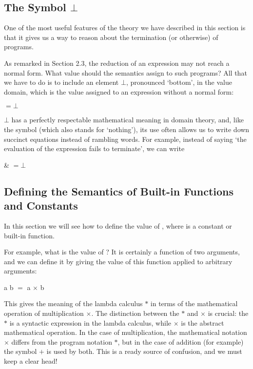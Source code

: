 \subsection{The Symbol $\bot$}

One of the most useful features of the theory we have described in this section
is that it gives us a way to reason about the termination (or otherwise) of
programs.

As remarked in Section 2.3, the reduction of an expression may not reach a
normal form. What value should the semantics assign to such programs? All
that we have to do is to include an element $\bot$, pronounced `bottom', in the
value domain, which is the value assigned to an expression without a normal
form:

\begin{mlcoded}
     $= \bot$
\end{mlcoded}

\noindent$\bot$ has a perfectly respectable mathematical meaning in domain theory, and,
like the symbol  (which also stands for `nothing'), its use often allows us to
write down succinct equations instead of rambling words. For example,
instead of saying `the evaluation of the expression  fails to terminate', we can
write

\begin{mlalign}
     & $= \bot$
\end{mlalign}

\subsection{Defining the Semantics of Built-in Functions and Constants}

In this section we will see how to define the value of , where  is a
constant or built-in function.

For example, what is the value of ? It is certainly a function of two arguments, and we can define it by giving the value of this function
applied to arbitrary arguments:
\begin{mlcoded}
     a b $=$ a $\times$ b
\end{mlcoded}
This gives the meaning of the lambda calculus $*$ in terms of the mathematical
operation of multiplication $\times$. The distinction between the $*$ and $\times$ is crucial:
the $*$ is a syntactic expression in the lambda calculus, while $\times$ is the abstract
mathematical operation. In the case of multiplication, the mathematical
notation $\times$ differs from the program notation $*$, but in the case of addition (for
example) the symbol $+$ is used by both. This is a ready source of confusion,
and we must keep a clear head!

